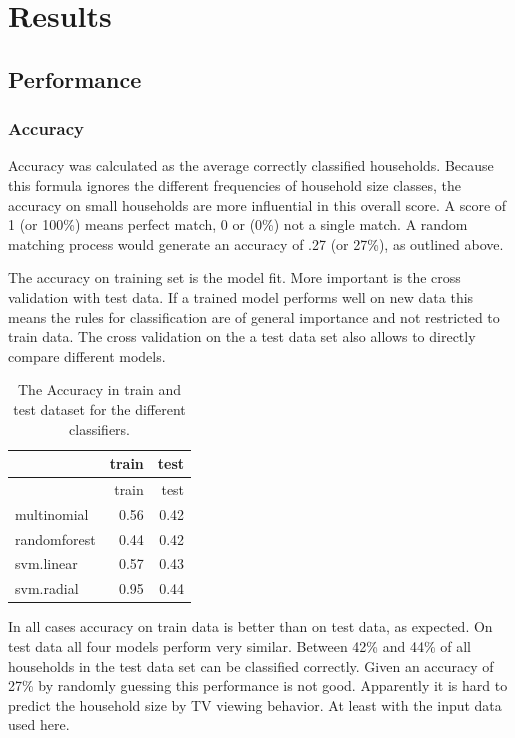 \documentclass[]{article}
\begin{document}
\hypertarget{results}{%
\section{Results}\label{results}}

\hypertarget{performance}{%
\subsection{Performance}\label{performance}}

\hypertarget{accuracy}{%
\subsubsection{Accuracy}\label{accuracy}}

Accuracy was calculated as the average correctly classified households.
Because this formula ignores the different frequencies of household size
classes, the accuracy on small households are more influential in this
overall score. A score of 1 (or 100\%) means perfect match, 0 or (0\%)
not a single match. A random matching process would generate an accuracy
of .27 (or 27\%), as outlined above.

The accuracy on training set is the model fit. More important is the
cross validation with test data. If a trained model performs well on new
data this means the rules for classification are of general importance
and not restricted to train data. The cross validation on the a test
data set also allows to directly compare different models.

\begin{longtable}[]{@{}lrr@{}}
\caption{\label{tab:tab7} The Accuracy in train and test dataset for the
different classifiers.}\tabularnewline
\toprule
& train & test\tabularnewline
\midrule
\endfirsthead
\toprule
& train & test\tabularnewline
\midrule
\endhead
multinomial & 0.56 & 0.42\tabularnewline
randomforest & 0.44 & 0.42\tabularnewline
svm.linear & 0.57 & 0.43\tabularnewline
svm.radial & 0.95 & 0.44\tabularnewline
\bottomrule
\end{longtable}

In all cases accuracy on train data is better than on test data, as
expected. On test data all four models perform very similar. Between
42\% and 44\% of all households in the test data set can be classified
correctly. Given an accuracy of 27\% by randomly guessing this
performance is not good. Apparently it is hard to predict the household
size by TV viewing behavior. At least with the input data used here.
\end{document}
